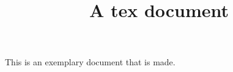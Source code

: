\documentclass{article}
\title{A tex document}
\begin{document}
This is an exemplary document that is made.
\end{document}
